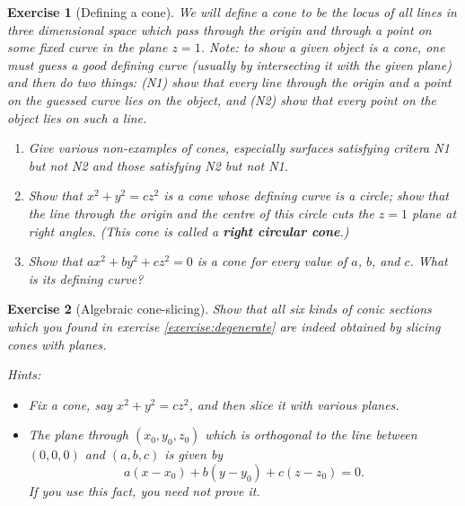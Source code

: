 \documentclass[a4paper,leqno,9pt]{article}
\theoremstyle{exercise}
\newtheorem{exercise}{Exercise}
\theoremstyle{plain}
\theoremstyle{definition}
\theoremstyle{remark}
\newcommand{\df}[1]{\textbf{#1}}
\begin{document}
\begin{exercise}[Defining a cone]
  We will define a cone to be the locus of all lines in three dimensional space which pass through the origin and through a point on some
  fixed curve in the plane $ z = 1 $. Note: to show a given object is a cone, one must guess a good defining curve (usually by intersecting
  it with the given plane) and then do two things: (N1) show that every line through the origin and a point on the guessed curve lies on the
  object, and (N2) show that every point on the object lies on such a line.
  \begin{enumerate}
    \item Give various non-examples of cones, especially surfaces satisfying critera N1 but not N2 and those satisfying N2 but not N1.
    \item Show that $ x^2 + y^2 = cz^2 $ is a cone whose defining curve is a circle; show that the line through the origin and the centre
          of this circle cuts the $ z = 1 $ plane at right angles. (This cone is called a \df{right circular cone}.)
    \item Show that $ ax^2 + by^2 + cz^2 = 0 $ is a cone for every value of $ a $, $ b $, and $ c $. What is its defining curve?
  \end{enumerate}
\end{exercise}

\begin{exercise}[Algebraic cone-slicing]
  Show that all six kinds of conic sections which you found in exercise \ref{exercise:degenerate} are indeed obtained by
  slicing cones with planes.

  \textit{Hints:}
  \begin{itemize}
    \item Fix a cone, say $ x^2 + y^2 = cz^2 $, and then slice it with various planes.
    \item The plane through $ (x_0, y_0, z_0) $ which is orthogonal to the line between $ (0,0,0) $ and $ (a,b,c) $ is given by
          \begin{displaymath}
            a(x-x_0) + b(y-y_0) + c(z-z_0) = 0.
          \end{displaymath}
          If you use this fact, you need not prove it.
  \end{itemize}
\end{exercise}
\end{document}
